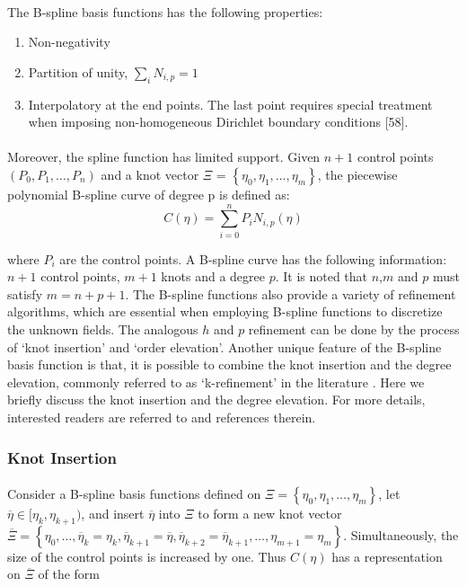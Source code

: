 \paragraph{}
The B-spline basis functions has the following properties:
\begin{enumerate}
    \item Non-negativity
    \item Partition of unity, $\sum_i N_{i,p}=1$
    \item Interpolatory at the end points. The last point requires special treatment when imposing non-homogeneous Dirichlet boundary conditions [58].
\end{enumerate}


\paragraph{}
Moreover, the spline function has limited support.
Given $n + 1$ control points $(P_0 ,P_1,\dots,P_n )$ and a knot vector 
    $\Xi$ = $\left\{
        \eta_0 ,\eta_1 ,\dots,\eta_m 
    \right\}$, the piecewise polynomial B-spline curve of degree p is defined as:
\begin{equation}
    C(\eta) = \sum_{i=0}^n P_i N_{i,p} (\eta)
\end{equation}

where $P_i$ are the control points.
A B-spline curve has the following information: $n+1$ control points, $m+1$ knots and a degree $p$.
It is noted that $n$,$m$ and $p$ must satisfy $m = n + p + 1$.
The B-spline functions also provide a variety of refinement algorithms, which are essential when employing B-spline functions to discretize the unknown fields.
The analogous $h$ and $p$ refinement can be done by the process of `knot insertion' and `order elevation'.
Another unique feature of the B-spline basis function is that, it is possible to combine the knot insertion and the degree elevation, commonly referred to as ‘k-refinement’ in the literature \cite{Hug2005b}.
Here we briefly discuss the knot insertion and the degree elevation.
For more details, interested readers are referred to \cite{Pie1997,Hug2005b} and references therein.


\subsubsection{Knot Insertion}
\paragraph{}
Consider a B-spline basis functions defined on $\Xi = \left\{
    \eta_0 ,\eta_1,\dots,\eta_m 
    \right\}$, let $\overline{\eta} \in [\eta_k ,\eta_{k+1} )$, and insert $\overline{\eta}$ into $\Xi$ to form a new knot vector $\overline{\Xi} = \left\{
    \eta_0 ,\dots, \overline{\eta}_k = \eta_k , 
    \overline{\eta}_{k+1} = \overline{\eta}, 
    \overline{\eta}_{k+2} = \overline{\eta}_{k+1} ,
    \dots,\eta_{m+1} = \eta_m
    \right\}$. Simultaneously, the size of the control points is increased by one. Thus $C(\eta)$ has a representation on $\overline{\Xi}$ of the form